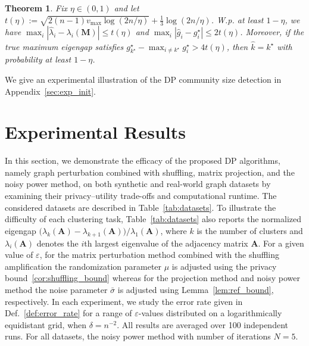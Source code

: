 \documentclass[11pt]{article}
\theoremstyle{plain}
\newtheorem{theorem}{Theorem}[section]
\theoremstyle{definition}
\theoremstyle{remark}
\begin{document}
\begin{theorem}
\label{thm:gap_detection}
Fix $\eta\in(0,1)$ and let $t(\eta) := \sqrt{2(n-1)v_{\max}\log(2n/\eta)} + \frac{1}{3}\log(2n/\eta)$. W.p. at least $1-\eta$, we have $\max_{i} |\hat\lambda_i-\lambda_i(\mathbf M)| \le t(\eta)$ and $\max_{i} |\hat g_i-g_i^\star| \le 2t(\eta)$. Moreover, if the true maximum eigengap satisfies $g_{k^\star}^\star - \max_{i\neq k^\star} g_i^\star > 4t(\eta)$, then $\hat k = k^\star$ with probability at least $1-\eta$.
\end{theorem}

We give an experimental illustration of the DP community size detection in Appendix~\ref{sec:exp_init}. 

\section{Experimental Results}

In this section, we demonstrate the efficacy of the proposed DP algorithms, namely graph perturbation combined with shuffling, matrix projection, and the noisy power method, on both synthetic and real-world graph datasets by examining their privacy–utility trade-offs and computational runtime. The considered datasets are described in Table~\ref{tab:datasets}. To illustrate the difficulty of each clustering task, Table~\ref{tab:datasets} also reports the normalized eigengap $\big(\lambda_k(\mathbf{A}) - \lambda_{k+1}(\mathbf{A})\big)/\lambda_1(\mathbf{A})$, where $k$ is the number of clusters and $\lambda_i(\mathbf{A})$ denotes the $i$th largest eigenvalue of the adjacency matrix $\mathbf{A}$.
For a given value of $\varepsilon$, for the matrix perturbation method combined with the shuffling amplification the randomization parameter $\mu$ is adjusted using the privacy bound~\ref{cor:shuffling_bound} whereas for the projection method and noisy power method the noise parameter $\bar{\sigma}$ is adjusted using  Lemma~\ref{lem:ref_bound}, respectively.
In each experiment, we study the error rate given in Def.~\ref{def:error_rate} for a range of $\varepsilon$-values distributed on a logarithmically equidistant grid, when $\delta= n^{-2}$. All results are averaged over 100 independent runs.
For all datasets, the noisy power method with number of iterations $N=5$. 
\end{document}
